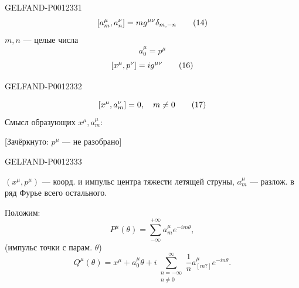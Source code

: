 \begin{GelfandAdjacentEvidence}{GELFAND-P001233}{1}
\begin{equation*}
\relax [a_m^\mu,a_n^\nu]=m g^{\mu\nu}\delta_{m,-n}\tag{14}
\end{equation*}
\(m,n\) --- целые числа
\begin{equation*}
a_0^\mu=p^\mu\tag{15}
\end{equation*}
\begin{equation*}
\relax [x^\mu,p^\nu]=i g^{\mu\nu}\tag{16}
\end{equation*}
\end{GelfandAdjacentEvidence}
\begin{GelfandAdjacentEvidence}{GELFAND-P001233}{2}

\begin{equation*}
\relax [x^\mu,a_m^\nu]=0,\quad m\ne0\tag{17}
\end{equation*}
Смысл образующих \(x^\mu,a_m^\mu\):

[Зачёркнуто: \(p^\mu\) --- не разобрано]
\end{GelfandAdjacentEvidence}
\begin{GelfandAdjacentEvidence}{GELFAND-P001233}{3}

\((x^\mu,p^\mu)\) --- коорд. и импульс центра тяжести летящей струны, \(a_m^\mu\) --- разлож. в ряд Фурье всего остального.

Положим:
\begin{equation*}
P^\mu(\theta)=\sum_{-\infty}^{+\infty}a_m^\mu e^{-im\theta},\tag{18}
\end{equation*}
(импульс точки с парам. \(\theta\))
\begin{equation*}
Q^\mu(\theta)=x^\mu+a_0^\mu\theta+
 i\sum_{\substack{n=-\infty\\n\ne0}}^{\infty}\frac1n a_{[m?]}^\mu e^{-in\theta}.\tag{19}
\end{equation*}
\end{GelfandAdjacentEvidence}
